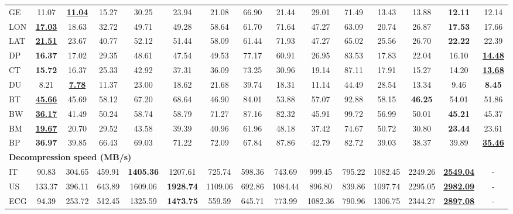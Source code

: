 \begin{table*}[htbp]
\begin{tabular}{@{}l *{14}{c}@{}}
GE & 11.07 & \underline{\textbf{11.04}} & 15.27 & 30.25 & 23.94 & 21.08 & 66.90 & 21.44 & 29.01 & 71.49 & 13.43 & 13.88 & \textbf{12.11} & 12.14 \\
LON & \underline{\textbf{17.03}} & 18.63 & 32.72 & 49.71 & 49.28 & 58.64 & 61.70 & 71.64 & 47.27 & 63.09 & 20.74 & 26.87 & \textbf{17.53} & 17.66 \\
LAT & \underline{\textbf{21.51}} & 23.67 & 40.77 & 52.12 & 51.44 & 58.09 & 61.44 & 71.93 & 47.27 & 65.02 & 25.56 & 26.70 & \textbf{22.22} & 22.39 \\
DP & \textbf{16.37} & 17.02 & 29.35 & 48.61 & 47.54 & 49.53 & 77.17 & 60.91 & 26.95 & 83.53 & 17.83 & 22.04 & 16.10 & \underline{\textbf{14.48}} \\
CT & \textbf{15.72} & 16.37 & 25.33 & 42.92 & 37.31 & 36.09 & 73.25 & 30.96 & 19.14 & 87.11 & 17.91 & 15.27 & 14.20 & \underline{\textbf{13.68}} \\
DU & 8.21 & \underline{\textbf{7.78}} & 11.37 & 23.00 & 18.62 & 21.68 & 39.74 & 18.31 & 11.14 & 44.49 & 28.54 & 13.34 & 9.46 & \textbf{8.45} \\
BT & \underline{\textbf{45.66}} & 45.69 & 58.12 & 67.20 & 68.64 & 46.90 & 84.01 & 53.88 & 57.07 & 92.88 & 58.15 & \textbf{46.25} & 54.01 & 51.86 \\
BW & \underline{\textbf{36.17}} & 41.49 & 50.24 & 58.74 & 58.79 & 71.27 & 87.16 & 82.32 & 45.91 & 99.72 & 56.99 & 50.01 & \textbf{45.21} & 45.37 \\
BM & \underline{\textbf{19.67}} & 20.70 & 29.52 & 43.58 & 39.39 & 40.96 & 61.96 & 48.18 & 37.42 & 74.67 & 50.72 & 30.80 & \textbf{23.44} & 23.61 \\
BP & \textbf{36.97} & 39.85 & 66.43 & 69.03 & 71.22 & 72.09 & 67.84 & 87.86 & 42.79 & 82.72 & 39.03 & 38.37 & 39.89 & \underline{\textbf{35.46}} \\
\midrule
\multicolumn{15}{l}{\textbf{Decompression speed (MB/s)}} \\
\midrule
IT & 90.83 & 304.65 & 459.91 & \textbf{1405.36} & 1207.61 & 725.74 & 598.36 & 743.69 & 999.45 & 795.22 & 1082.45 & 2249.26 & \underline{\textbf{2549.04}} & - \\
US & 133.37 & 396.11 & 643.89 & 1609.06 & \textbf{1928.74} & 1109.06 & 692.86 & 1084.44 & 896.80 & 839.86 & 1097.74 & 2295.05 & \underline{\textbf{2982.09}} & - \\
ECG & 94.39 & 253.72 & 512.45 & 1325.59 & \textbf{1473.75} & 559.59 & 645.71 & 773.99 & 1082.36 & 790.96 & 1306.75 & 2344.27 & \underline{\textbf{2897.08}} & - \\

\end{tabular}
\end{table*}
